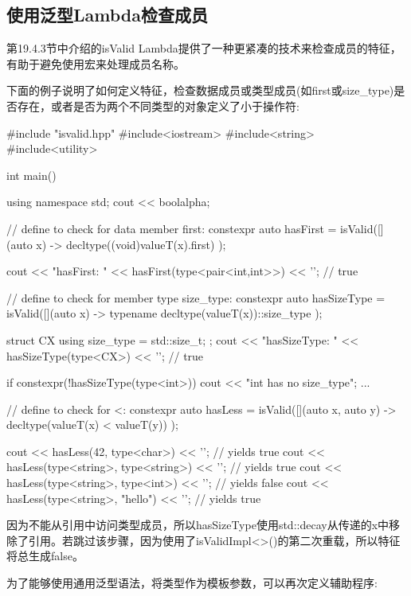 \subsection{使用泛型Lambda检查成员}

第19.4.3节中介绍的isValid Lambda提供了一种更紧凑的技术来检查成员的特征，有助于避免使用宏来处理成员名称。

下面的例子说明了如何定义特征，检查数据成员或类型成员(如first或size\_type)是否存在，或者是否为两个不同类型的对象定义了小于操作符:

\begin{cpp}
#include "isvalid.hpp"
#include<iostream>
#include<string>
#include<utility>

int main()
{
	using namespace std;
	cout << boolalpha;
	
	// define to check for data member first:
	constexpr auto hasFirst
		= isValid([](auto x) -> decltype((void)valueT(x).first) {
				});

	cout << "hasFirst: " << hasFirst(type<pair<int,int>>) << ’\n’; // true
	
	// define to check for member type size_type:
	constexpr auto hasSizeType
		= isValid([](auto x) -> typename decltype(valueT(x))::size_type {
				});
			
	struct CX {
		using size_type = std::size_t;
	};
	cout << "hasSizeType: " << hasSizeType(type<CX>) << ’\n’; // true
	
	if constexpr(!hasSizeType(type<int>)) {
		cout << "int has no size_type\n";
		...
	}

	// define to check for <:
	constexpr auto hasLess
		= isValid([](auto x, auto y) -> decltype(valueT(x) < valueT(y)) {
				});
			
	cout << hasLess(42, type<char>) << ’\n’; // yields true
	cout << hasLess(type<string>, type<string>) << ’\n’; // yields true
	cout << hasLess(type<string>, type<int>) << ’\n’; // yields false
	cout << hasLess(type<string>, "hello") << ’\n’; // yields true
}
\end{cpp}

因为不能从引用中访问类型成员，所以hasSizeType使用std::decay从传递的x中移除了引用。若跳过该步骤，因为使用了isValidImpl<>()的第二次重载，所以特征将总生成false。

为了能够使用通用泛型语法，将类型作为模板参数，可以再次定义辅助程序:


